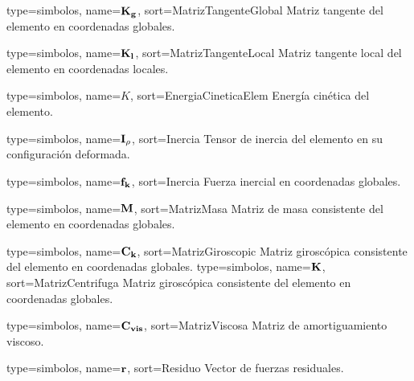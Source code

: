 {
	type={simbolos},
	name={$\bf{K_g}$}, %
	sort={MatrizTangenteGlobal} %
}
{Matriz tangente del elemento en coordenadas globales.}

{
	type={simbolos},
	name={$\bf{K_l}$}, %
	sort={MatrizTangenteLocal} %
}
{Matriz tangente local del elemento en coordenadas locales.}

{
	type={simbolos},
	name={$K$}, %
	sort={EnergiaCineticaElem} %
}
{Energía cinética del elemento.}


{
	type={simbolos},
	name={$\bf{I_{\rho}}$}, %
	sort={Inercia} %
}
{Tensor de inercia del elemento en su configuración deformada.}

{
	type={simbolos},
	name={$\bf{f_k}$}, %
	sort={Inercia} %
}
{Fuerza inercial en coordenadas globales.}

{
	type={simbolos},
	name={$\bf{M}$}, %
	sort={MatrizMasa} %
}
{Matriz de masa consistente del elemento en coordenadas globales.}

{
	type={simbolos},
	name={$\bf{C}_k$}, %
	sort={MatrizGiroscopic} %
}
{Matriz giroscópica consistente del elemento en coordenadas globales.}
{
	type={simbolos},
	name={$\bf{K}$}, %
	sort={MatrizCentrifuga} %
}
{Matriz giroscópica consistente del elemento en coordenadas globales.}

{
	type={simbolos},
	name={$\bf{C}_{vis}$}, %
	sort={MatrizViscosa} %
}
{Matriz de amortiguamiento viscoso.}

{
	type={simbolos},
	name={$\bf{r}$}, %
	sort={Residuo} %
}
{Vector de fuerzas residuales.}

